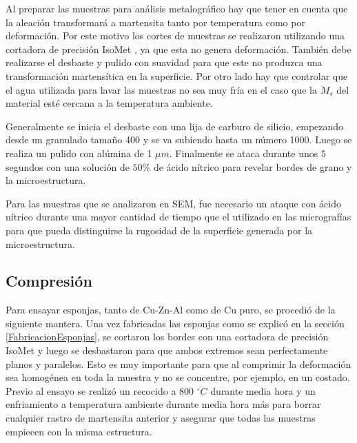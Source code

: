 \documentclass[a4paper,12pt,fleqn,twoside,openany]{book}
\begin{document}
Al preparar las muestras para análisis metalográfico hay que tener en cuenta que la aleación transformará a martensita tanto por temperatura como por deformación. Por este motivo los cortes de muestras se realizaron utilizando una cortadora de precisión IsoMet , ya que esta no genera deformación. También debe realizarse el desbaste y pulido con suavidad para que este no produzca una transformación 
martensítica en la superficie. Por otro lado hay que controlar que el agua utilizada para lavar las muestras no sea muy fría en el caso 
que la $M_s$ del material esté cercana a la temperatura ambiente. 

Generalmente se inicia el desbaste con una lija de carburo de silicio, empezando desde un granulado tamaño 400 y se va subiendo hasta un número 1000. 
Luego se realiza un pulido con alúmina de 1 $\mu m$. Finalmente se ataca durante unos $5$ segundos con una solución de $50 \% $ de ácido nítrico para revelar bordes de grano y la microestructura. 

Para las muestras que se analizaron en SEM, fue necesario un ataque con ácido nítrico durante una mayor cantidad de tiempo que el utilizado en las micrografías para que pueda distinguirse la rugosidad de la superficie generada por la microestructura.

\subsection{Compresión}



Para ensayar esponjas, tanto de Cu-Zn-Al como de Cu puro, se procedió de la siguiente mantera. Una vez fabricadas las esponjas como se explicó en la sección  \ref{FabricacionEsponjas}, se cortaron los bordes con una cortadora de precisión IsoMet y luego se desbastaron para que ambos extremos sean perfectamente planos y paralelos. Esto es muy importante para que al comprimir la deformación sea homogénea en toda la muestra y no se concentre, por ejemplo, en un costado. Previo al ensayo se realizó un recocido a 800 $^\circ C$ durante media hora y un enfriamiento a temperatura ambiente durante media hora más para borrar cualquier rastro de martensita anterior y asegurar que todas las muestras empiecen con la misma estructura. 
\end{document}
